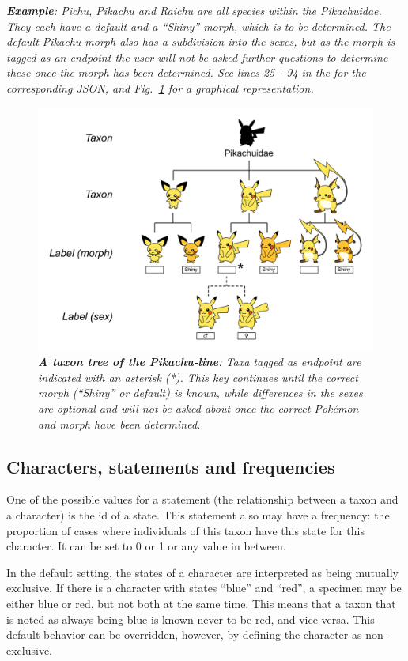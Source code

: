 \documentclass[10pt,letterpaper]{article}
\begin{document}
\textit{\textbf{Example}: Pichu, Pikachu and Raichu are all species within the Pikachuidae. They each have a default and a ``Shiny'' morph, which is to be determined. The default Pikachu morph also has a subdivision into the sexes, but as the morph is tagged as an endpoint the user will not be asked further questions to determine these once the morph has been determined. See lines 25 - 94 in the  for the corresponding JSON, and Fig.~\ref{fig3} for a graphical representation.}


\begin{figure}[!h]
  \includegraphics[width=\textwidth]{Images/Fig3}
  \caption{\textit{\textbf{A taxon tree of the Pikachu-line}:
Taxa tagged as endpoint are indicated with an asterisk (*). This key continues until the correct morph (``Shiny'' or default) is known, while differences in the sexes are optional and will not be asked about once the correct Pokémon and morph have been determined.
  }}
  \label{fig3}
\end{figure}
\subsection*{
Characters, statements and frequencies
}
One of the possible values for a statement (the relationship between a taxon and a character) is the id of a state. This statement also may have a frequency: the proportion of cases where individuals of this taxon have this state for this character. It can be set to 0 or 1 or any value in between.

In the default setting, the states of a character are interpreted as being mutually exclusive. If there is a character with states ``blue'' and ``red'', a specimen may be either blue or red, but not both at the same time. This means that a taxon that is noted as always being blue is known never to be red, and vice versa. This default behavior can be overridden, however, by defining the character as non-exclusive.
\end{document}
